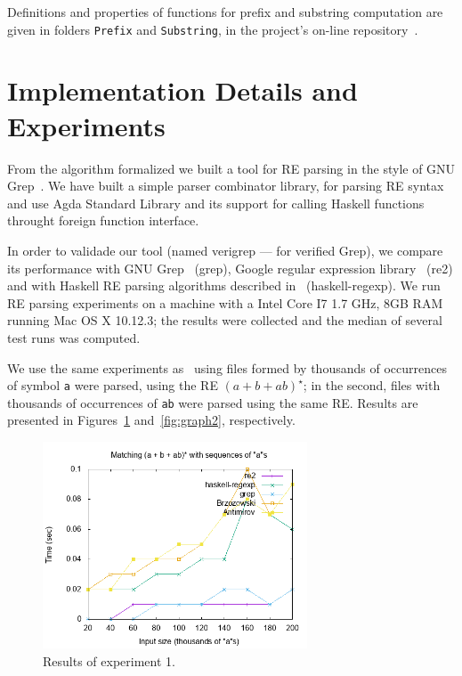 \documentclass[review]{elsarticle}
\begin{document}
Definitions and properties of functions for prefix and substring computation
are given in folders \texttt{Prefix} and \texttt{Substring}, in the project's on-line
repository~\cite{regex-rep}.

\section{Implementation Details and Experiments}\label{sec:exp}

From the algorithm formalized we built a tool for RE parsing in the
style of GNU Grep~\cite{Grep}. We have built a simple parser combinator
library, for parsing RE syntax and use Agda Standard Library and its
support for calling Haskell functions throught foreign function interface.

In order to validade our tool (named verigrep --- for verified Grep), we
compare its performance with GNU Grep~\cite{Grep} (grep), Google
regular expression library~\cite{re2} (re2) and with Haskell RE
parsing algorithms described in~\cite{Fischer2010} (haskell-regexp).
We run RE parsing experiments on a machine with a Intel Core I7 1.7
GHz, 8GB RAM running Mac OS X 10.12.3; the results were collected and
the median of several test runs was computed.

We use the same experiments as~\cite{SulzmannL14} using files formed
by thousands of occurrences of
symbol \texttt{a} were parsed, using the RE $(a + b + ab)^\star$; in
the second, files with thousands of occurrences of \texttt{ab} were
parsed using the same RE. Results are presented in
Figures~\ref{fig:graph1} and~\ref{fig:graph2}, respectively.

\begin{figure}[!ht]
    \includegraphics[width=0.7\textwidth]{as.png}
   \centering
   \caption{Results of experiment 1.}
   \label{fig:graph1}
\end{figure}
\end{document}
